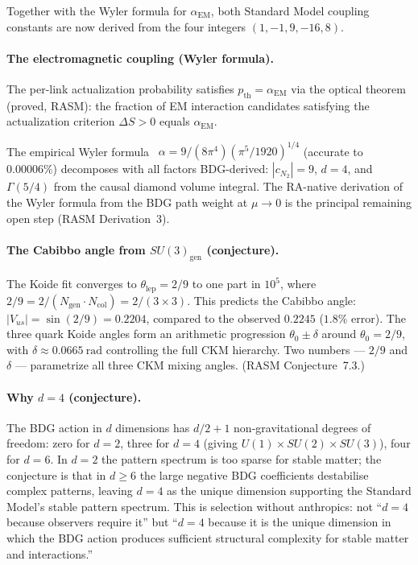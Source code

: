 \documentclass[11pt,a4paper]{article}
\begin{document}
Together with the Wyler formula for $\alpha_{\mathrm{EM}}$, both Standard Model
coupling constants are now derived from the four integers $(1,-1,9,-16,8)$.

\paragraph{The electromagnetic coupling (Wyler formula).}
The per-link actualization probability satisfies $p_{\mathrm{th}} = \alpha_{\mathrm{EM}}$
via the optical theorem (proved, RASM): the fraction of EM interaction candidates
satisfying the actualization criterion $\Delta S > 0$ equals $\alpha_{\mathrm{EM}}$.

The empirical Wyler formula~\citep{Wyler1969} $\alpha = 9/(8\pi^4)(\pi^5/1920)^{1/4}$
(accurate to $0.00006\%$) decomposes with all factors BDG-derived: $|c_{N_2}| = 9$,
$d = 4$, and $\Gamma(5/4)$ from the causal diamond volume integral.  The
RA-native derivation of the Wyler formula from the BDG path weight at $\mu\to 0$
is the principal remaining open step (RASM Derivation~3).

\paragraph{The Cabibbo angle from $SU(3)_{\mathrm{gen}}$ (conjecture).}
The Koide fit converges to $\theta_{\mathrm{lep}} = 2/9$ to one part in $10^5$,
where $2/9 = 2/(N_{\mathrm{gen}} \cdot N_{\mathrm{col}}) = 2/(3\times 3)$.
This predicts the Cabibbo angle: $|V_{us}| = \sin(2/9) = 0.2204$,
compared to the observed $0.2245$ ($1.8\%$ error).
The three quark Koide angles form an arithmetic progression
$\theta_0 \pm \delta$ around $\theta_0 = 2/9$,
with $\delta \approx 0.0665~\mathrm{rad}$ controlling the full CKM hierarchy.
Two numbers --- $2/9$ and $\delta$ --- parametrize all three CKM mixing angles.
(RASM Conjecture~7.3.)

\paragraph{Why $d = 4$ (conjecture).}
The BDG action in $d$ dimensions has $d/2 + 1$ non-gravitational degrees
of freedom: zero for $d = 2$, three for $d = 4$ (giving
$U(1)\times SU(2)\times SU(3)$), four for $d = 6$. In $d = 2$ the
pattern spectrum is too sparse for stable matter; the conjecture is that
in $d \geq 6$ the large negative BDG coefficients destabilise complex
patterns, leaving $d = 4$ as the unique dimension supporting the Standard
Model's stable pattern spectrum. This is selection without anthropics:
not ``$d = 4$ because observers require it'' but ``$d = 4$ because it is
the unique dimension in which the BDG action produces sufficient structural
complexity for stable matter and interactions.''
\end{document}
